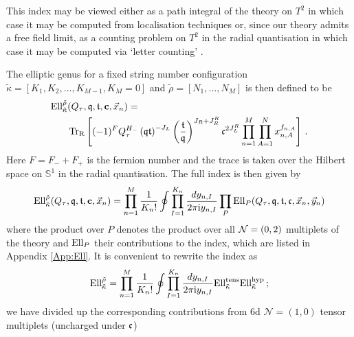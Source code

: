 \documentclass[main.tex]{subfiles}
\begin{document}
This index may be viewed either as a path integral of the theory on $T^2$ in which case it may be computed from localisation techniques \cite{Benini:2013nda,Benini:2013xpa} or, since our theory admits a free field limit, as a counting problem on $T^2$ in the radial quantisation in which case it may be computed via `letter counting' \cite{Putrov:2015jpa,Gadde:2013wq,Gadde:2013ftv,Gadde:2014ppa,Gadde:2013lxa,Nakayama:2011pa,Cordova:2017ohl,Bourton:2017pee}. 

The elliptic genus for a fixed string number configuration \newline $\tilde{\kappa}=[K_1,K_2,\dots,K_{M-1},K_M=0]$ and $\tilde{\rho}=[N_1,\dots,N_M]$ is then defined to be  
\begin{equation}\label{eqn:Ellnodefect}
\begin{aligned}
\textrm{Ell}^{\tilde{\rho}}_{\tilde{\kappa}}&(Q_{\tau},\mathfrak{q},\mathfrak{t},\mathbf{c},\vec{x}_{n})=\\ &\operatorname{Tr}_{\text{R}}\left[(-1)^FQ_{\tau}^{H_-}\left(\mathfrak{q}\mathfrak{t}\right)^{-J_L}\left(\frac{\mathfrak{t}}{\mathfrak{q}}\right)^{J_R+J_R^R}\mathfrak{c}^{2J_L^R}\prod_{n=1}^M\prod_{A=1}^{N}x_{n,A}^{f_{n,A}}\right]\,.
\end{aligned}
\end{equation}
Here $F=F_-+F_+$ is the fermion number and the trace is taken over the Hilbert space on $\mathbb{S}^1$ in the radial quantisation. 
The full index is then given by
\begin{equation}
\textrm{Ell}^{\tilde{\rho}}_{\tilde{\kappa}}(Q_{\tau},\mathfrak{q},\mathfrak{t},\mathbf{c},\vec{x}_{n})=\prod_{n=1}^M\frac{1}{K_n!}\oint\prod_{I=1}^{K_n}\frac{dy_{n,I}}{2\pi\mathrm{i} y_{n,I}}\prod_{P}\mathcal{\textrm{Ell}}_{P}(Q_{\tau},\mathfrak{q},\mathfrak{t},\mathfrak{c},\vec{x}_{n},\vec{y}_{n})
\end{equation}
where the product over $P$ denotes the product over all $\mathcal{N}=(0,2)$ multiplets of the theory and $\textrm{Ell}_P$ their contributions to the index, which are listed in Appendix \ref{App:Ell}. It is convenient to rewrite the index as
\begin{equation}\label{eqn:Ellnodefectcont}
\textrm{Ell}^{\tilde{\rho}}_{\tilde{\kappa}}=\prod_{n=1}^M\frac{1}{K_n!}\oint\prod_{I=1}^{K_n}\frac{dy_{n,I}}{2\pi\mathrm{i} y_{n,I}}\textrm{Ell}^{\text{tens}}_{\tilde{\kappa}}\textrm{Ell}^{\text{hyp}}_{\tilde{\kappa}}\,;
\end{equation}
we have divided up the corresponding contributions from 6d $\mathcal{N}=(1,0)$ tensor multiplets (uncharged under $\mathfrak{c}$)
\end{document}

